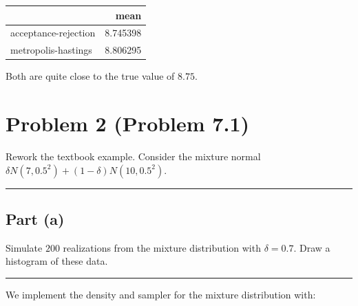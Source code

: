 \documentclass[
  11pt,
]{paper}
\begin{document}
\begin{longtable}[]{@{}lr@{}}
\toprule\noalign{}
& mean \\
\midrule\noalign{}
\endhead
\bottomrule\noalign{}
\endlastfoot
acceptance-rejection & 8.745398 \\
metropolis-hastings & 8.806295 \\
\end{longtable}

Both are quite close to the true value of \(8.75\).

\hypertarget{problem-2-problem-7.1}{%
\section{Problem 2 (Problem 7.1)}\label{problem-2-problem-7.1}}

Rework the textbook example. Consider the mixture normal
\(\delta N(7,0.5^2) + (1-\delta) N(10,0.5^2)\).

\begin{center}\rule{0.5\linewidth}{0.5pt}\end{center}

\hypertarget{part-a-1}{%
\subsection{Part (a)}\label{part-a-1}}

Simulate \(200\) realizations from the mixture distribution with
\(\delta = 0.7\). Draw a histogram of these data.

\begin{center}\rule{0.5\linewidth}{0.5pt}\end{center}

We implement the density and sampler for the mixture distribution with:
\end{document}
